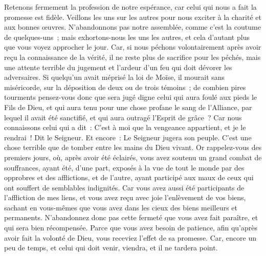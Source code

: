 \begin{multicols}{2}
Retenons fermement la profession de notre espérance, car celui qui nous a fait la promesse est fidèle.
Veillons les uns sur les autres pour nous exciter à la charité et aux bonnes œuvres.
N'abandonnons pas notre assemblée, comme c'est la coutume de quelques-uns~; mais exhortons-nous les uns les autres, et cela d'autant plus que vous voyez approcher le jour.
Car, si nous péchons volontairement après avoir reçu la connaissance de la vérité, il ne reste plus de sacrifice pour les péchés,
mais une attente terrible du jugement et l'ardeur d'un feu qui doit dévorer les adversaires.
Si quelqu'un avait méprisé la loi de Moïse, il mourait sans miséricorde, sur la déposition de deux ou de trois témoins~;
de combien pires tourments pensez-vous donc que sera jugé digne celui qui aura foulé aux pieds le Fils de Dieu, et qui aura tenu pour une chose profane le sang de l'Alliance, par lequel il avait été sanctifié, et qui aura outragé l'Esprit de grâce~?
Car nous connaissons celui qui a dit~: C'est à moi que la vengeance appartient, et je le rendrai~! Dit le Seigneur. Et encore~: Le Seigneur jugera son peuple.
C'est une chose terrible que de tomber entre les mains du Dieu vivant.
Or rappelez-vous des premiers jours, où, après avoir été éclairés, vous avez soutenu un grand combat de souffrances,
ayant été, d'une part, exposés à la vue de tout le monde par des opprobres et des afflictions, et de l'autre, ayant participé aux maux de ceux qui ont souffert de semblables indignités.
Car vous avez aussi été participants de l'affliction de mes liens, et vous avez reçu avec joie l'enlèvement de vos biens, sachant en vous-mêmes que vous avez dans les cieux des biens meilleurs et permanents.
N'abandonnez donc pas cette fermeté que vous avez fait paraître, et qui sera bien récompensée.
Parce que vous avez besoin de patience, afin qu'après avoir fait la volonté de Dieu, vous receviez l'effet de sa promesse.
Car, encore un peu de temps, et celui qui doit venir, viendra, et il ne tardera point.

\end{multicols}
